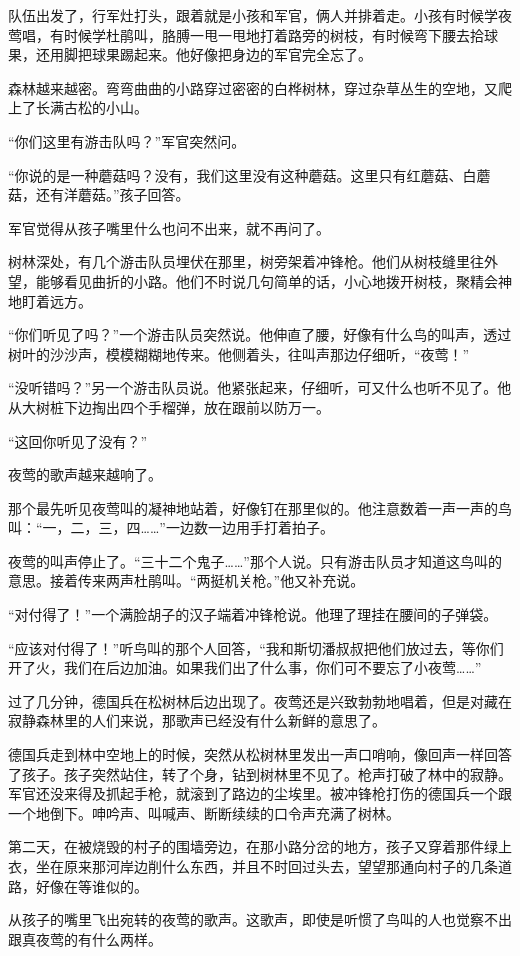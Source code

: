 \documentclass[12pt,UTF-8,openany]{ctexbook}
\begin{document}
\begin{large}
    队伍出发了，行军灶打头，跟着就是小孩和军官，俩人并排着走。小孩有时候学夜莺唱，有时候学杜鹃叫，胳膊一甩一甩地打着路旁的树枝，有时候弯下腰去拾球果，还用脚把球果踢起来。他好像把身边的军官完全忘了。
    
    森林越来越密。弯弯曲曲的小路穿过密密的白桦树林，穿过杂草丛生的空地，又爬上了长满古松的小山。
    
    “你们这里有游击队吗？”军官突然问。
    
    “你说的是一种蘑菇吗？没有，我们这里没有这种蘑菇。这里只有红蘑菇、白蘑菇，还有洋蘑菇。”孩子回答。
    
    军官觉得从孩子嘴里什么也问不出来，就不再问了。
    
    树林深处，有几个游击队员埋伏在那里，树旁架着冲锋枪。他们从树枝缝里往外望，能够看见曲折的小路。他们不时说几句简单的话，小心地拨开树枝，聚精会神地盯着远方。
    
    “你们听见了吗？”一个游击队员突然说。他伸直了腰，好像有什么鸟的叫声，透过树叶的沙沙声，模模糊糊地传来。他侧着头，往叫声那边仔细听，“夜莺！”
    
    “没听错吗？”另一个游击队员说。他紧张起来，仔细听，可又什么也听不见了。他从大树桩下边掏出四个手榴弹，放在跟前以防万一。
    
    “这回你听见了没有？”
    
    夜莺的歌声越来越响了。
    
    那个最先听见夜莺叫的凝神地站着，好像钉在那里似的。他注意数着一声一声的鸟叫：“一，二，三，四……”一边数一边用手打着拍子。
    
    夜莺的叫声停止了。“三十二个鬼子……”那个人说。只有游击队员才知道这鸟叫的意思。接着传来两声杜鹃叫。“两挺机关枪。”他又补充说。
    
    “对付得了！”一个满脸胡子的汉子端着冲锋枪说。他理了理挂在腰间的子弹袋。
    
    “应该对付得了！”听鸟叫的那个人回答，“我和斯切潘叔叔把他们放过去，等你们开了火，我们在后边加油。如果我们出了什么事，你们可不要忘了小夜莺……”
    
    过了几分钟，德国兵在松树林后边出现了。夜莺还是兴致勃勃地唱着，但是对藏在寂静森林里的人们来说，那歌声已经没有什么新鲜的意思了。
    
    德国兵走到林中空地上的时候，突然从松树林里发出一声口哨响，像回声一样回答了孩子。孩子突然站住，转了个身，钻到树林里不见了。枪声打破了林中的寂静。军官还没来得及抓起手枪，就滚到了路边的尘埃里。被冲锋枪打伤的德国兵一个跟一个地倒下。呻吟声、叫喊声、断断续续的口令声充满了树林。
    
    第二天，在被烧毁的村子的围墙旁边，在那小路分岔的地方，孩子又穿着那件绿上衣，坐在原来那河岸边削什么东西，并且不时回过头去，望望那通向村子的几条道路，好像在等谁似的。
    
    从孩子的嘴里飞出宛转的夜莺的歌声。这歌声，即使是听惯了鸟叫的人也觉察不出跟真夜莺的有什么两样。
    
\end{large}
\end{document}
